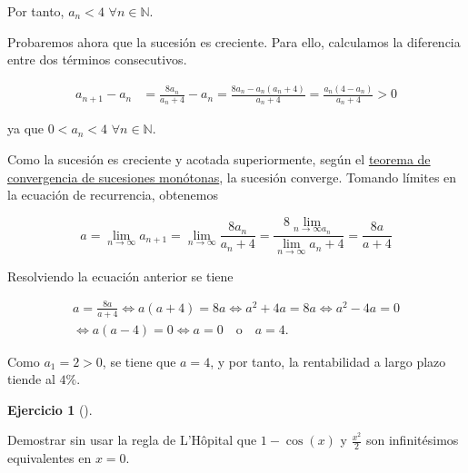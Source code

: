 \documentclass[
  a4paper,
]{scrreport}
\theoremstyle{definition}
\newtheorem{exercise}{Ejercicio}[chapter]
\theoremstyle{remark}
\begin{document}
\begin{tcolorbox}
Por tanto, \(a_n < 4\) \(\forall n\in\mathbb{N}\).

Probaremos ahora que la sucesión es creciente. Para ello, calculamos la
diferencia entre dos términos consecutivos.

\begin{align*}
a_{n+1}-a_n 
&= \frac{8a_n}{a_n+4}-a_n 
= \frac{8a_n-a_n(a_n+4)}{a_n+4} 
= \frac{a_n(4-a_n)}{a_n+4}
> 0
\end{align*}

ya que \(0<a_n<4\) \(\forall n\in\mathbb{N}\).

Como la sucesión es creciente y acotada superiormente, según el
\href{https://aprendeconalf.es/analisis-manual/04-sucesiones.html\#thm-convergencia-monotona}{teorema
de convergencia de sucesiones monótonas}, la sucesión converge. Tomando
límites en la ecuación de recurrencia, obtenemos

\[
a 
= \lim_{n\to\infty} a_{n+1} 
= \lim_{n\to\infty} \frac{8a_n}{a_n+4} 
= \frac{8\lim_{n\to\infty a_n}}{\lim_{n\to\infty} a_n+4}
= \frac{8a}{a+4}
\]

Resolviendo la ecuación anterior se tiene

\[
\begin{gathered}
a = \frac{8a}{a+4} 
\Leftrightarrow a(a+4) = 8a 
\Leftrightarrow a^2+4a = 8a 
\Leftrightarrow a^2-4a = 0 \\
\Leftrightarrow a(a-4) = 0
\Leftrightarrow a = 0 \quad \text{o} \quad a = 4.
\end{gathered}
\]

Como \(a_1 = 2 > 0\), se tiene que \(a = 4\), y por tanto, la
rentabilidad a largo plazo tiende al \(4\%\).

\end{tcolorbox}

\begin{exercise}[]\protect\hypertarget{exr-3}{}\label{exr-3}

Demostrar sin usar la regla de L'Hôpital que \(1 - \cos(x)\) y
\(\frac{x^2}{2}\) son infinitésimos equivalentes en \(x=0\).

\end{exercise}
\end{document}
